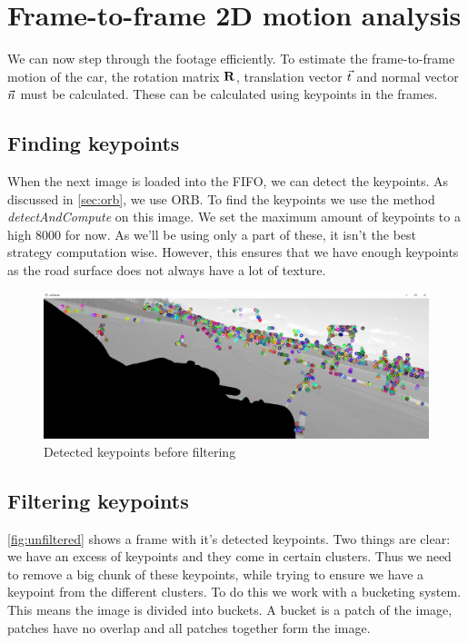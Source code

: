 \section{Frame-to-frame 2D motion analysis}
We can now step through the footage efficiently. To estimate the frame-to-frame motion of the car, the rotation matrix $\mathbf{R}$, translation vector $\vec t$ and normal vector $\vec n$ must be calculated. These can be calculated using keypoints in the frames. 

\subsection{Finding keypoints}
When the next image is loaded into the FIFO, we can detect the keypoints. As discussed in \autoref{sec:orb}, we use ORB. To find the keypoints we use the method \textit{detectAndCompute} on this image. We set the maximum amount of keypoints to a high 8000 for now. As we'll be using only a part of these, it isn't the best strategy computation wise. However, this ensures that we have enough keypoints as the road surface does not always have a lot of texture. \bigskip

\begin{figure}
    \centering
    \includegraphics[width=1\textwidth]{figures/Unfiltered_keypoints.png}
    \caption{Detected keypoints before filtering}
    \label{fig:unfiltered}
\end{figure}

\subsection{Filtering keypoints}\label{ssec:filtering}

\autoref{fig:unfiltered} shows a frame with it's detected keypoints. Two things are clear: we have an excess of keypoints and they come in certain clusters. Thus we need to remove a big chunk of these keypoints, while trying to ensure we have a keypoint from the different clusters. To do this we work with a bucketing system. This means the image is divided into buckets. A bucket is a patch of the image, patches have no overlap and all patches together form the image.\bigskip 

